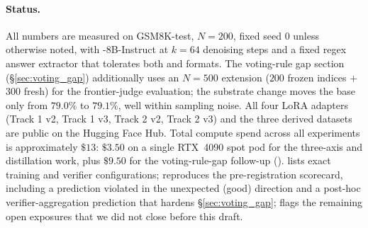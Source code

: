 \paragraph{Status.}
All numbers are measured on GSM8K-test, $N{=}200$, fixed seed $0$
unless otherwise noted, with \LLaDA{}-8B-Instruct at $k{=}64$
denoising steps and a fixed regex answer extractor that tolerates
both  and \code{\#\#\#\#} formats.  The voting-rule
gap section (\S\ref{sec:voting_gap}) additionally uses an
$N{=}500$ extension ($200$ frozen indices $+$ $300$ fresh) for the
frontier-judge evaluation; the substrate change moves the base
\cmaj{} only from $79.0\%$ to $79.1\%$, well within sampling
noise.  All four LoRA adapters (Track 1 v2, Track 1 v3, Track 2
v2, Track 2 v3) and the three derived datasets are public on the
Hugging Face Hub.  Total compute spend across all experiments is
approximately $\$13$: $\$3.50$ on a single RTX~4090 spot pod for
the three-axis and distillation work, plus $\$9.50$ for the
voting-rule-gap follow-up
().  
lists exact training and verifier configurations;
 reproduces the pre-registration scorecard,
including a prediction violated in the unexpected (good) direction
and a post-hoc verifier-aggregation prediction that hardens
\S\ref{sec:voting_gap};  flags the remaining open
exposures that we did not close before this draft.
